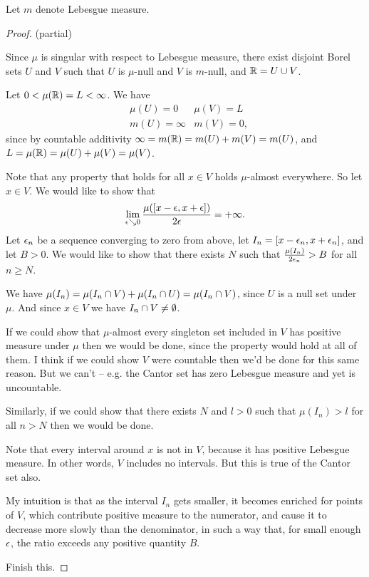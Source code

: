   Let $m$ denote Lebesgue measure.

  \begin{proof}
     (partial)

    Since $\mu$ is singular with respect to Lebesgue measure, there exist disjoint Borel sets $U$ and $V$ such
    that $U$ is $\mu$-null and $V$ is $m$-null, and $\mathbb{R} = U \cup V$.

    Let $0 < \mu(\mathbb{R}) = L < \infty$. We have
    \begin{align*}
      &\mu(U) = 0     & \mu(V) = L \\
      &m(U) = \infty & m(V) = 0,
    \end{align*}
    since by countable additivity $\infty = m(\mathbb{R}) = m(U) + m(V) = m(U)$,
    and $L = \mu(\mathbb{R}) = \mu(U) + \mu(V) = \mu(V)$.

    Note that any property that holds for all $x \in V$ holds $\mu$-almost everywhere. So let $x \in V$. We would
    like to show that
    \begin{align*}
      \lim_{\eps \searrow 0} \frac{\mu([x - \eps, x + \eps])}{2\eps} = +\infty.
    \end{align*}
    Let $\epsilon_n$ be a sequence converging to zero from above, let $I_n = [x - \epsilon_n, x + \epsilon_n]$, and
    let $B > 0$. We would like to show that there exists $N$ such that $\frac{\mu(I_n)}{2\epsilon_n} > B$ for
    all $n \geq N$.

    We have $\mu(I_n) = \mu(I_n \cap V) + \mu(I_n \cap U) = \mu(I_n \cap V)$, since $U$ is a null set
    under $\mu$. And since $x \in V$ we have $I_n \cap V \neq \emptyset$.

    If we could show that $\mu$-almost every singleton set included in $V$ has positive measure under $\mu$ then
    we would be done, since the property would hold at all of them. I think if we could show $V$ were countable
    then we'd be done for this same reason. But we can't -- e.g. the Cantor set has zero Lebesgue measure and yet
    is uncountable.

    Similarly, if we could show that there exists $N$ and $l > 0$ such that $\mu(I_n) > l$ for all $n > N$ then
    we would be done.

    Note that every interval around $x$ is not in $V$, because it has positive Lebesgue measure. In other
    words, $V$ includes no intervals. But this is true of the Cantor set also.

    My intuition is that as the interval $I_n$ gets smaller, it becomes enriched for points of $V$, which
    contribute positive measure to the numerator, and cause it to decrease more slowly than the denominator, in
    such a way that, for small enough $\epsilon$, the ratio exceeds any positive quantity $B$.

     Finish this.
  \end{proof}

